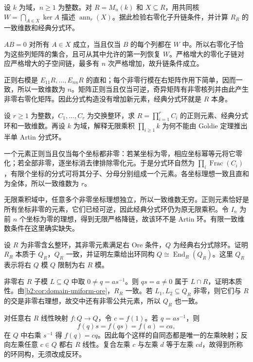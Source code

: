\begin{optionalexercise}\label{b2:ex:19-matrix-annihilators}
	设 \(k\) 为域，\(n\ge1\) 为整数。对 \(R=M_n(k)\) 和 \(X\subseteq R\)，用共同核 \(W=\bigcap_{A\in X}\ker A\) 描述 \(\operatorname{ann}_r(X)\)。据此检验右零化子升链条件，并计算 \(R_R\) 的一致维数和经典分式环。
\end{optionalexercise}
\begin{solution}
	\(AB=0\) 对所有 \(A\in X\) 成立，当且仅当 \(B\) 的每个列都在 \(W\) 中。所以右零化子恰为这些列矩阵的集合，且可从其中允许的第一列恢复 \(W\)。严格增大的零化子链对应严格增大的子空间链，最多有 \(n\) 次严格增加，故升链条件成立。

	正则右模是 \(E_{11}R,\ldots,E_{nn}R\) 的直和；每个非零行模在右矩阵作用下简单，因而一致，所以一致维数为 \(n\)。矩阵正则当且仅当可逆，奇异矩阵有非零核列并由此产生非零右零化矩阵。因此分式构造没有增加新元素，经典分式环就是 \(R\) 本身。
\end{solution}

\begin{optionalexercise}\label{b2:ex:19-product-domains}
	设 \(r\ge1\) 为整数，\(C_1,\ldots,C_r\) 为交换整环，求 \(R=\prod_{i=1}^rC_i\) 的正则元素、经典分式环和一致维数。再设 \(k\) 为域，解释无限乘积 \(\prod_{i\ge1}k\) 为何不能由 Goldie 定理推出半单 Artin 分式环。
\end{optionalexercise}
\begin{solution}
	一个元素正则当且仅当每个坐标都非零：若某坐标为零，相应坐标幂等元将它零化；若全部非零，逐坐标消去律排除零化元。于是分式环自然为 \(\prod_i\operatorname{Frac}(C_i)\)，有限个坐标的分式可将其分子、分母分别组成一个元素。各坐标理想一致且直和为全体，所以一致维数为 \(r\)。

	无限乘积域中，任意多个非零坐标理想独立，所以一致维数无穷。正则元素恰好是所有坐标非零的元素，它们已经可逆，因此经典分式环仍为原无限乘积。令 \(I_n\) 为前 \(n\) 个坐标为零的理想，得到无限严格降链，故该环不是 Artin 环。有限一致维数条件在这里确实缺失。
\end{solution}

\begin{optionalexercise}\label{b2:ex:19-domain-uniform-ore}
	设 \(R\) 为非零含幺整环，其非零元素满足右 Ore 条件，\(Q\) 为经典右分式除环。证明 \(R_R\) 本质于 \(Q_R\)，\(Q_R\) 一致，并证明左乘给出环同构 \(Q\cong\operatorname{End}_R(Q_R)\)。这里 \(Q_R\) 表示将右 \(Q\) 模 \(Q\) 限制为右 \(R\) 模。
\end{optionalexercise}
\begin{solution}
	非零右 \(R\) 子模 \(L\subseteq Q\) 中取 \(0\ne q=as^{-1}\)。则 \(qs=a\ne0\) 属于 \(L\cap R\)，证明本质性。由\cref{b2:cor:domain-uniform-ore}，\(R_R\) 一致。若 \(L_1,L_2\subseteq Q_R\) 非零，则它们与 \(R\) 的交是非零右理想，故交中还有非零公共元素，所以 \(Q_R\) 也一致。

	对任意右 \(R\) 线性映射 \(f:Q\to Q\)，令 \(c=f(1)\)。若 \(q=as^{-1}\)，则
	\[
		f(q)s=f(qs)=f(a)=ca,
	\]
	在 \(Q\) 中右乘 \(s^{-1}\) 得 \(f(q)=cq\)。因此每个这样的自同态都是唯一的左乘映射；反向左乘任意 \(c\in Q\) 都右 \(R\) 线性。复合左乘 \(c\) 与左乘 \(d\) 等于左乘 \(cd\)，故得到所称的环同构，无须改成反环。
\end{solution}

